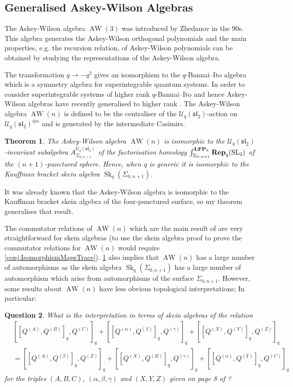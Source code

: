 \documentclass{article}
\newcommand{\catname}[1]{{\normalfont\textbf{#1}}}
\newcommand{\LFP}{\catname{LFP}}
\newcommand{\Rep}{\catname{Rep}}
\newcommand{\Sk}{\operatorname{Sk}}
\newcommand{\AW}{\operatorname{AW}}
\newcommand{\SL}{\operatorname{SL}}
\newcommand{\slgroup}{\mathfrak{sl}}
\newtheorem{thm}{Theorem}
\newtheorem{qs}[thm]{Question}
\begin{document}
\subsection{Generalised Askey-Wilson Algebras}

The Askey-Wilson algebra $\AW(3)$ was introduced by Zhedanov in the 90s. This algebra generates the Askey-Wilson orthogonal polynomials and the main properties, e.g. the recursion relation, of Askey-Wilson polynomials can be obtained by studying the representations of the Askey-Wilson algebra.

The transformation $q \to -q^2$ gives an isomorphism to the $q$-Bannai--Ito algebra which is a symmetry algebra for superintegrable quantum systems. In order to consider superintegrable systems of higher rank $q$-Bannai--Ito and hence Askey-Wilson algebras have recently generalised to higher rank \cite{PostWalter}. The Askey-Wilson algebra $\AW(n)$ is defined to be the centraliser of the $\mathcal{U}_q(\slgroup_2)$-action on $\mathcal{U}_q(\slgroup_2)^{\otimes n}$ and is generated by the intermediate Casimirs. 

\begin{thm}
\label{thm:awalgebras}
The Askey-Wilson algebra $\AW(n)$ is isomorphic to the $\mathcal{U}_q(\slgroup_2)$-invariant subalgebra $A_{\Sigma_{0,n+1}}^{\mathcal{U}_q(\slgroup_2)}$  of the factorisation homology $\int^{\LFP_k}_{\Sigma_{0, n+1}} \Rep_{q}(\SL_2)$ of the $(n+1)$-punctured sphere. Hence, when $q$ is generic it is isomorphic to the Kauffman bracket skein algebra $\Sk_q(\Sigma_{0, n+1})$. 
\end{thm}

It was already known that the Askey-Wilson algebra is isomorphic to the Kauffman bracket skein algebra of the four-punctured surface, so my theorem generalises that result.  

The commutator relations of $\AW(n)$ which are the main result of \cite{DeClercqHadweijch19} are very straightforward for skein algebras (to use the skein algebra proof to prove the commutator relations for $\AW(n)$ would require \cref{conj:IsomorphismMapsTrace}). \cref{thm:awalgebras} also implies that $\AW(n)$ has a large number of automorphisms as the skein algebra $\Sk_q(\Sigma_{0,n+1})$ has a large number of automorphism which arise from automorphisms of the surface $\Sigma_{0,n+1}$.
However, some results about $\AW(n)$ have less obvious topological interpretations; In particular:

\begin{qs} What is the interpretation in terms of skein algebras of the relation 
\begin{align*}
&[[Q^{(A)}, Q^{(B)}]_q, Q^{(C)}]_q 
+ [[Q^{(\alpha)}, Q^{(\beta)}]_q, Q^{(\gamma)}]_q 
+ [[Q^{(X)}, Q^{(Y)}]_q, Q^{(Z)}]_q \\
&= [[Q^{(A)}, Q^{(\beta)}]_q, Q^{(Z)}]_q
+ [[Q^{(X)}, Q^{(B)}]_q, Q^{(\gamma)}]_q
+ [[Q^{(\alpha)}, Q^{(Y)}]_q, Q^{(C)}]_q 
\end{align*}
for the triples $(A,B,C)$, $(\alpha, \beta, \gamma)$ and $(X,Y,Z)$ given on page 8 of \cite{PostWalter}?
\end{qs}

\printbibliography
\end{document}
